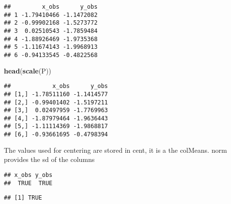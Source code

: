 \documentclass[]{article}
\newenvironment{Shaded}{\begin{snugshade}}{\end{snugshade}}
\newcommand{\KeywordTok}[1]{\textcolor[rgb]{0.13,0.29,0.53}{\textbf{#1}}}
\newcommand{\DecValTok}[1]{\textcolor[rgb]{0.00,0.00,0.81}{#1}}
\newcommand{\StringTok}[1]{\textcolor[rgb]{0.31,0.60,0.02}{#1}}
\newcommand{\ControlFlowTok}[1]{\textcolor[rgb]{0.13,0.29,0.53}{\textbf{#1}}}
\newcommand{\OperatorTok}[1]{\textcolor[rgb]{0.81,0.36,0.00}{\textbf{#1}}}
\newcommand{\NormalTok}[1]{#1}
\begin{document}
\begin{verbatim}
##         x_obs      y_obs
## 1 -1.79410466 -1.1472082
## 2 -0.99902168 -1.5273772
## 3  0.02510543 -1.7859484
## 4 -1.88926469 -1.9735368
## 5 -1.11674143 -1.9968913
## 6 -0.94133545 -0.4822568
\end{verbatim}

\begin{Shaded}
\begin{Highlighting}[]
\KeywordTok{head}\NormalTok{(}\KeywordTok{scale}\NormalTok{(P))}
\end{Highlighting}
\end{Shaded}

\begin{verbatim}
##            x_obs      y_obs
## [1,] -1.78511160 -1.1414577
## [2,] -0.99401402 -1.5197211
## [3,]  0.02497959 -1.7769963
## [4,] -1.87979464 -1.9636443
## [5,] -1.11114369 -1.9868817
## [6,] -0.93661695 -0.4798394
\end{verbatim}

The values used for centering are stored in cent, it is a the colMeans.
norm provides the sd of the columns

\begin{Shaded}
\end{Shaded}

\begin{verbatim}
## x_obs y_obs 
##  TRUE  TRUE
\end{verbatim}

\begin{Shaded}
\end{Shaded}

\begin{verbatim}
## [1] TRUE
\end{verbatim}
\end{document}
